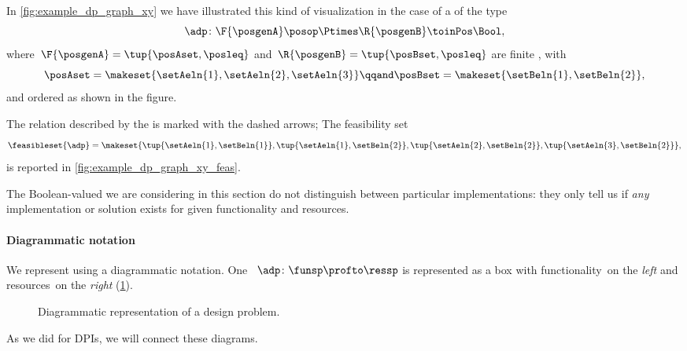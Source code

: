 \begin{example}
    \label{exa:visualize-dp}
    In \cref{fig:example_dp_graph_xy} we have illustrated this kind of visualization in the case of a  of the type
    \begin{equation}
        \adp \colon \F{\posgenA} \posop \Ptimes \R{\posgenB} \toinPos \Bool,
    \end{equation}
    where~$\F{\posgenA} = \tup{\posAset, \posleq}$ and~$ \R{\posgenB} = \tup{\posBset, \posleq}$ are finite , with
    \begin{equation}
        \posAset = \makeset{ \setAeln{1}, \setAeln{2}, \setAeln{3} }
        \qqand
        \posBset = \makeset{ \setBeln{1}, \setBeln{2}},
    \end{equation}
    and ordered as shown in the figure.

    The relation described by the  is marked with the dashed arrows;
    The feasibility set
    \begin{equation}
        \feasibleset{\adp} = \makeset{\tup{\setAeln{1}, \setBeln{1}}, \tup{\setAeln{1}, \setBeln{2}}, \tup{\setAeln{2}, \setBeln{2}}, \tup{\setAeln{3}, \setBeln{2}} },
    \end{equation}
    is reported in \cref{fig:example_dp_graph_xy_feas}.
\end{example}




The Boolean-valued  we are considering in this section do not distinguish between particular implementations: they only tell us if \emph{any} implementation or solution exists for given functionality and resources.


    \paragraph{Diagrammatic notation}
    We represent  using a diagrammatic notation.
    One ~$\adp \colon \funsp \profto \ressp$ is represented as a box with functionality~\funsp on the \emph{left} and resources~\ressp on the \emph{right} (\cref{fig:diagrammaticdp}).
    \begin{figure}[h!]
        \centering
        \caption{Diagrammatic representation of a design problem. }
        \label{fig:diagrammaticdp}
    \end{figure}

    As we did for DPIs, we will connect these diagrams.


